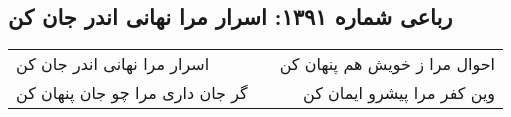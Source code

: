 \begin{center}
\section*{رباعی شماره ۱۳۹۱: اسرار مرا نهانی اندر جان کن}
\label{sec:1391}
\begin{longtable}{l p{0.5cm} r}
اسرار مرا نهانی اندر جان کن
&&
احوال مرا ز خویش هم پنهان کن
\\
گر جان داری مرا چو جان پنهان کن
&&
وین کفر مرا پیشرو ایمان کن
\\
\end{longtable}
\end{center}
